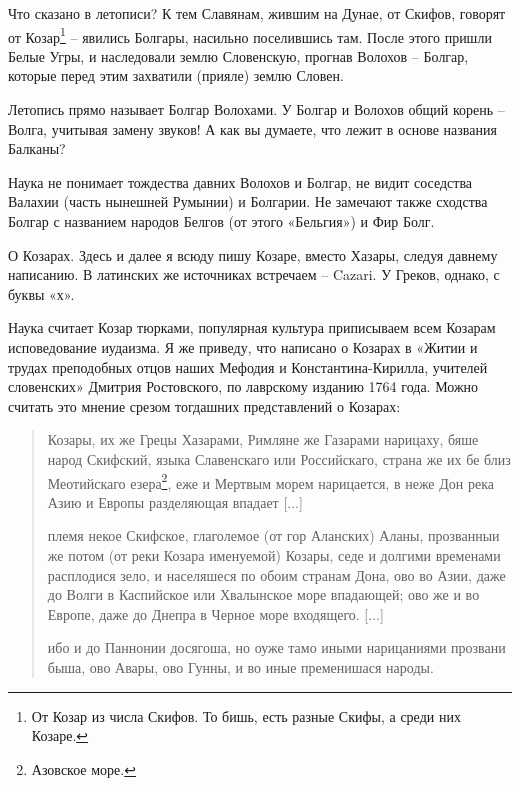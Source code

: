 
Что сказано в летописи? К тем Славянам, жившим на Дунае, от Скифов, говорят от Козар\footnote{От Козар из числа Скифов. То бишь, есть разные Скифы, а среди них Козаре.} – явились Болгары, насильно поселившись там. После этого пришли Белые Угры, и наследовали землю Словенскую, прогнав Волохов – Болгар, которые перед этим захватили (прияле) землю Словен.

Летопись прямо называет Болгар Волохами. У Болгар и Волохов общий корень – Волга, учитывая замену звуков! А как вы думаете, что лежит в основе названия Балканы?

Наука не понимает тождества давних Волохов и Болгар, не видит соседства Валахии (часть нынешней Румынии) и Болгарии. Не замечают также сходства Болгар с названием народов Белгов (от этого «Бельгия») и Фир Болг.


О Козарах. Здесь и далее я всюду пишу Козаре, вместо Хазары, следуя давнему написанию. В латинских же источниках встречаем – Cazari. У Греков, однако, с буквы «х».

Наука считает Козар тюрками, популярная культура приписываем всем Козарам исповедование иудаизма. Я же приведу, что написано о Козарах в «Житии и трудах преподобных отцов наших Мефодия и Константина-Кирилла, учителей словенских» Дмитрия Ростовского, по лаврскому изданию 1764 года. Можно считать это мнение срезом тогдашних представлений о Козарах:

\begin{quotation}
Козары, их же Грецы Хазарами, Римляне же Газарами нарицаху, бяше народ Скифский, языка Славенскаго или Российскаго, страна же их бе близ Меотийскаго езера\footnote{Азовское море.}, еже и Мертвым морем нарицается, в неже Дон река Азию и Европы разделяющая впадает [...]

племя некое Скифское, глаголемое (от гор Аланских) Аланы, прозванныи же потом (от реки Козара именуемой) Козары, седе и долгими временами расплодися зело, и населяшеся по обоим странам Дона, ово во Азии, даже до Волги в Каспийское или Хвалынское море впадающей; ово же и во Европе, даже до Днепра в Черное море входящего. [...]

ибо и до Паннонии досягоша, но оуже тамо иными нарицаниями прозвани быша, ово Авары, ово Гунны, и во иные пременишася народы.
\end{quotation}

